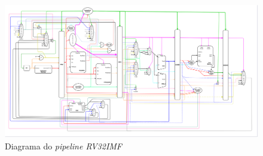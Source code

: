 \begin{figure}[H]
\centering
    \includegraphics[angle=90,width=1\textwidth,height=1\textheight,keepaspectratio]{../images/uarch_diagrams/pipeline-RV32IMF.png}
    \caption{Diagrama do \textit{pipeline RV32IMF}}
\end{figure}

